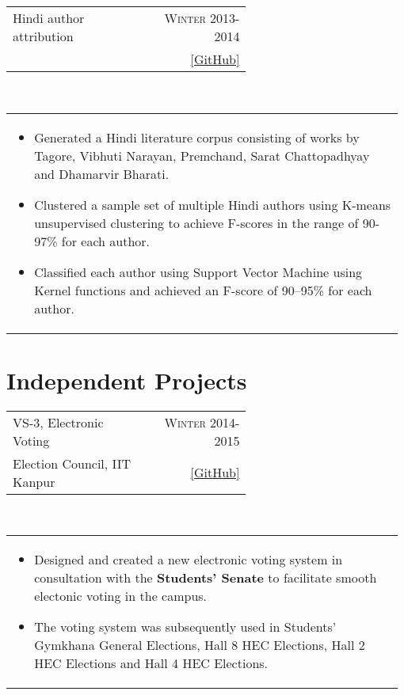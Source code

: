 \documentclass[a4paper]{article} %
\newcommand{\verticalspacing}{-0.25cm}
\newcommand{\bulletspace}{0.7cm}
\newcommand{\projectheadspacing}{6.9cm}
\newcommand{\cproject}[5]{%
    \begin{tabular}{p{0.60\linewidth}r}
        \textcolor{NavyBlue}{\small #2} & \multicolumn{1}{m{ \projectheadspacing{} }}{\raggedleft \small {\textsc{#1}}}\\
        \small {#3} & \small {#4}
    \end{tabular}\\
    \begin{tabular}{p{0.98\linewidth}}
    \vspace{-0.3cm}
        \small{#5}
    \end{tabular}
    \vspace{\verticalspacing{}}
}
\begin{document}
\cproject
    {Winter 2013-2014}
    {Hindi author attribution}
    {\textsc{\raggedright Artificial Intelligence}, Professor Amitabha Mukherjee}
    {\href{https://github.com/srijanshetty/author-attribution} {[GitHub]}}
    {%
        \begin{itemize}[leftmargin=\bulletspace{}]
            \item Generated a Hindi literature corpus consisting of works by Tagore,
                Vibhuti Narayan, Premchand, Sarat Chattopadhyay and Dhamarvir Bharati.
            \item Clustered a sample set of multiple Hindi authors using K-means unsupervised clustering to achieve
                F-scores in the range of 90-97\% for each author.
            \item Classified each author using Support Vector Machine using Kernel functions
                and achieved an F-score of 90--95\% for each author.
        \end{itemize}
    }

\section{Independent Projects}

\cproject
    {Winter 2014-2015}
    {VS-3, Electronic Voting}
    {Election Council, IIT Kanpur}
    {\href{https://github.com/srijanshetty/elections} {\small{[GitHub]}}}
    {%
        \begin{itemize}[leftmargin=\bulletspace{}]
            \item Designed and created a new electronic voting system in consultation with the \textbf{Students' Senate}
                to facilitate smooth electonic voting in the campus.
            \item The voting system was subsequently used in Students'
                Gymkhana General Elections, Hall 8 HEC Elections, Hall 2 HEC Elections and Hall 4 HEC Elections.
        \end{itemize}
    }
\end{document}
